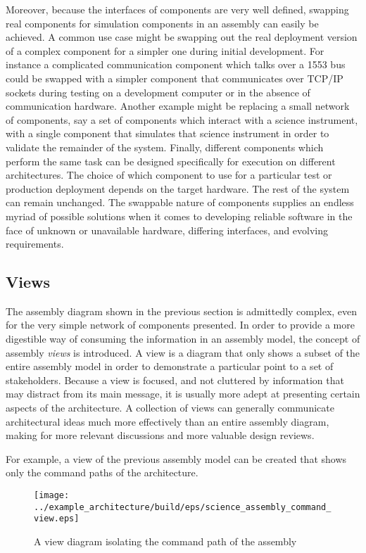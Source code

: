 Moreover, because the interfaces of components are very well defined, swapping real components for simulation components in an assembly can easily be achieved. A common use case might be swapping out the real deployment version of a complex component for a simpler one during initial development. For instance a complicated communication component which talks over a 1553 bus could be swapped with a simpler component that communicates over TCP/IP sockets during testing on a development computer or in the absence of communication hardware. Another example might be replacing a small network of components, say a set of components which interact with a science instrument, with a single component that simulates that science instrument in order to validate the remainder of the system. Finally, different components which perform the same task can be designed specifically for execution on different architectures. The choice of which component to use for a particular test or production deployment depends on the target hardware. The rest of the system can remain unchanged. The swappable nature of components supplies an endless myriad of possible solutions when it comes to developing reliable software in the face of unknown or unavailable hardware, differing interfaces, and evolving requirements.

\subsection{Views}

The assembly diagram shown in the previous section is admittedly complex, even for the very simple network of components presented. In order to provide a more digestible way of consuming the information in an assembly model, the concept of assembly \textit{views} is introduced. A view is a diagram that only shows a subset of the entire assembly model in order to demonstrate a particular point to a set of stakeholders. Because a view is focused, and not cluttered by information that may distract from its main message, it is usually more adept at presenting certain aspects of the architecture. A collection of views can generally communicate architectural ideas much more effectively than an entire assembly diagram, making for more relevant discussions and more valuable design reviews.

For example, a view of the previous assembly model can be created that shows only the command paths of the architecture.

\begin{figure}[H]
  \texttt{[image: ../example\_architecture/build/eps/science\_assembly\_command\_view.eps]}
  \caption{A view diagram isolating the command path of the assembly}
\end{figure}

